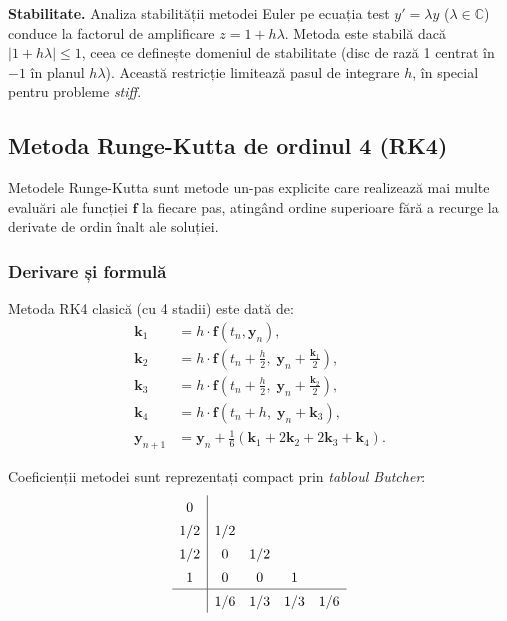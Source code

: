 \textbf{Stabilitate.} Analiza stabilității metodei Euler pe ecuația test
$y' = \lambda y$ ($\lambda \in \mathbb{C}$) conduce la factorul de amplificare
$z = 1 + h\lambda$. Metoda este stabilă dacă $|1 + h\lambda| \leq 1$, ceea ce
definește domeniul de stabilitate (disc de rază 1 centrat în $-1$ în planul
$h\lambda$). Această restricție limitează pasul de integrare $h$, în special
pentru probleme \emph{stiff}.

\subsection{Metoda Runge-Kutta de ordinul 4 (RK4)}
\label{subsec:rk4}

Metodele Runge-Kutta sunt metode un-pas explicite care realizează mai multe
evaluări ale funcției $\mathbf{f}$ la fiecare pas, atingând ordine superioare
fără a recurge la derivate de ordin înalt ale soluției.

\subsubsection{Derivare și formulă}

Metoda RK4 clasică (cu 4 stadii) este dată de:
\begin{equation}
\label{eq:rk4}
\begin{aligned}
    \mathbf{k}_1 &= h \cdot \mathbf{f}(t_n, \mathbf{y}_n), \\
    \mathbf{k}_2 &= h \cdot \mathbf{f}\!\left(t_n + \tfrac{h}{2},\; \mathbf{y}_n + \tfrac{\mathbf{k}_1}{2}\right), \\
    \mathbf{k}_3 &= h \cdot \mathbf{f}\!\left(t_n + \tfrac{h}{2},\; \mathbf{y}_n + \tfrac{\mathbf{k}_2}{2}\right), \\
    \mathbf{k}_4 &= h \cdot \mathbf{f}(t_n + h,\; \mathbf{y}_n + \mathbf{k}_3), \\
    \mathbf{y}_{n+1} &= \mathbf{y}_n + \frac{1}{6}\left(\mathbf{k}_1 + 2\mathbf{k}_2 + 2\mathbf{k}_3 + \mathbf{k}_4\right).
\end{aligned}
\end{equation}

Coeficienții metodei sunt reprezentați compact prin \emph{tabloul Butcher}:
\begin{equation}
\label{eq:butcher_rk4}
\renewcommand{\arraystretch}{1.4}
\begin{array}{c|cccc}
    0   &     &     &     &   \\
    1/2 & 1/2 &     &     &   \\
    1/2 & 0   & 1/2 &     &   \\
    1   & 0   & 0   & 1   &   \\
    \hline
        & 1/6 & 1/3 & 1/3 & 1/6
\end{array}
\end{equation}

